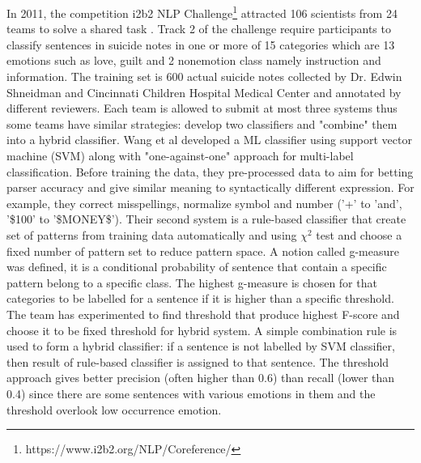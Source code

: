In 2011, the competition i2b2 NLP Challenge\footnote{https://www.i2b2.org/NLP/Coreference/} attracted 106 scientists from 24 teams to solve a shared task \cite{Pestian2012}. Track 2 of the challenge require participants to classify sentences in suicide notes in one or more of 15 categories which are 13 emotions such as love, guilt and 2 nonemotion class namely instruction and information. The training set is 600 actual suicide notes collected by Dr. Edwin Shneidman and Cincinnati Children Hospital Medical Center and annotated by different reviewers. Each team is allowed to submit at most three systems thus some teams have similar strategies: develop two classifiers and "combine" them into a hybrid classifier. Wang et al \cite{Wang2012} developed a ML classifier using support vector machine (SVM) along with "one-against-one" approach for multi-label classification. Before training the data, they pre-processed data to aim for betting parser accuracy and give similar meaning to syntactically different expression. For example, they correct misspellings, normalize symbol and number (’+’ to ’and’, ’\$100’ to ’\$MONEY\$’). Their second system is a rule-based classifier that create set of patterns from training data automatically and using $\chi^2$ test and choose a fixed number of pattern set to reduce pattern space. A notion called g-measure was defined, it is a conditional probability of sentence that contain a specific pattern belong to a specific class. The highest g-measure is chosen for that categories to be labelled for a sentence if it is higher than a specific threshold. The team has experimented to find threshold that produce highest F-score and choose it to be fixed threshold for hybrid system. A simple combination rule is used to form a hybrid classifier: if a sentence is not labelled by SVM classifier, then result of rule-based classifier is assigned to that sentence. The threshold approach gives better precision (often higher than 0.6) than recall (lower than 0.4) since there are some sentences with various emotions in them and the threshold overlook low occurrence emotion.\\

